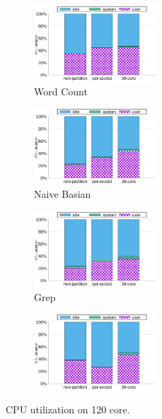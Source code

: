 \begin{figure}[tb]
    \centering
    \begin{subfigure}[b]{0.25\textwidth}
        \includegraphics[width=1.8in]{graph/wc_cpuutils_docker.eps}
        \caption{Word Count}
    \end{subfigure}%
    \begin{subfigure}[b]{0.25\textwidth}
        \includegraphics[width=1.8in]{graph/nb_cpuutils_docker.eps}
        \caption{Naive Basian}
    \end{subfigure}%
    \begin{subfigure}[b]{0.25\textwidth}
        \includegraphics[width=1.8in]{graph/grep_cpuutils_docker.eps}
        \caption{Grep}
    \end{subfigure}%
    \begin{subfigure}[b]{0.25\textwidth}
        \includegraphics[width=1.8in]{graph/kmeans_cpuutils_docker.eps}
        \caption{}
    \end{subfigure}%
        \centering
    \caption{CPU utilization on 120 core.}
    \label{fig:utilization2}
\end{figure}
